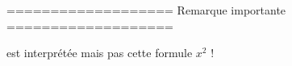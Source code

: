 \begin{pseudoverb}
===================
Remarque importante
===================

\squaremacro{} est interprétée mais pas
cette formule $x^2$ !
\end{pseudoverb} 

